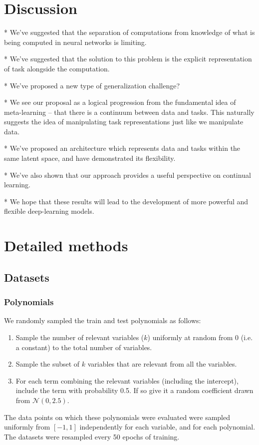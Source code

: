 \documentclass{article}
\begin{document}
\section{Discussion}

* We've suggested that the separation of computations from knowledge of what is being computed in neural networks is limiting.

* We've suggested that the solution to this problem is the explicit representation of task alongside the computation.

* We've proposed a new type of generalization challenge?

* We see our proposal as a logical progression from the fundamental idea of meta-learning -- that there is a continuum between data and tasks. This naturally suggests the idea of manipulating task representations just like we manipulate data.

* We've proposed an architecture which represents data and tasks within the same latent space, and have demonstrated its flexibility.

* We've also shown that our approach provides a useful perspective on continual learning.

* We hope that these results will lead to the development of more powerful and flexible deep-learning models.




\newpage
\appendix

\section{Detailed methods}
\subsection{Datasets}
\subsubsection{Polynomials} \label{meth_data_poly}
We randomly sampled the train and test polynomials as follows:
\begin{enumerate}
\item Sample the number of relevant variables ($k$) uniformly at random from 0 (i.e. a constant) to the total number of variables.
\item Sample the subset of $k$ variables that are relevant from all the variables.
\item For each term combining the relevant variables (including the intercept), include the term with probability 0.5. If so give it a random coefficient drawn from $\mathcal{N}(0, 2.5)$.
\end{enumerate}
The data points on which these polynomials were evaluated were sampled uniformly from $[-1, 1]$ independently for each variable, and for each polynomial. The datasets were resampled every 50 epochs of training. \par
\end{document}
